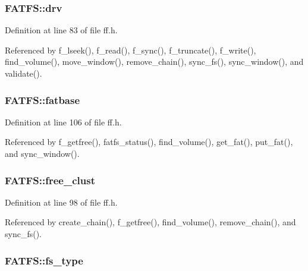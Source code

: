 \hypertarget{structFATFS_a6a791560e2687e8b1569bfce61208d2d}{
\subsubsection[{drv}]{ F\-A\-T\-F\-S\-::drv}}\label{structFATFS_a6a791560e2687e8b1569bfce61208d2d}


Definition at line 83 of file ff.\-h.



Referenced by f\-\_\-lseek(), f\-\_\-read(), f\-\_\-sync(), f\-\_\-truncate(), f\-\_\-write(), find\-\_\-volume(), move\-\_\-window(), remove\-\_\-chain(), sync\-\_\-fs(), sync\-\_\-window(), and validate().

\hypertarget{structFATFS_a848fba02c4aabe02ef2984e578f33d64}{
\subsubsection[{fatbase}]{ F\-A\-T\-F\-S\-::fatbase}}\label{structFATFS_a848fba02c4aabe02ef2984e578f33d64}


Definition at line 106 of file ff.\-h.



Referenced by f\-\_\-getfree(), fatfs\-\_\-status(), find\-\_\-volume(), get\-\_\-fat(), put\-\_\-fat(), and sync\-\_\-window().

\hypertarget{structFATFS_a5fb49e6ac511bd97eaffdd636d0e4165}{
\subsubsection[{free\-\_\-clust}]{ F\-A\-T\-F\-S\-::free\-\_\-clust}}\label{structFATFS_a5fb49e6ac511bd97eaffdd636d0e4165}


Definition at line 98 of file ff.\-h.



Referenced by create\-\_\-chain(), f\-\_\-getfree(), find\-\_\-volume(), remove\-\_\-chain(), and sync\-\_\-fs().

\hypertarget{structFATFS_add27d97babe807b573eac98a71dc4ae5}{
\subsubsection[{fs\-\_\-type}]{ F\-A\-T\-F\-S\-::fs\-\_\-type}}\label{structFATFS_add27d97babe807b573eac98a71dc4ae5}


